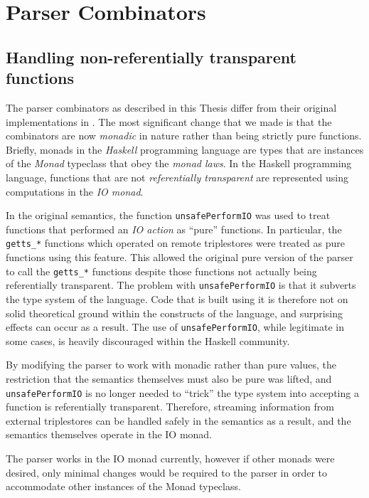 \documentclass[../main.tex]{subfiles}
\begin{document}
\chapter{Parser Combinators}

\section{Handling non-referentially transparent functions}

The parser combinators as described in this Thesis differ from their original implementations
in \cite{frosthafiz2008}.  The most significant change that we made is that the combinators are now {\em monadic} in nature rather than being strictly pure functions.
Briefly, monads in the {\em Haskell} programming language are types that are instances of the {\em Monad} typeclass that obey the
{\em monad laws}.  In the Haskell programming language, functions that are not {\em referentially transparent} are represented using computations in the {\em IO monad}.

In the original semantics, the function \texttt{unsafePerformIO} was used to treat functions that performed an {\em IO action} as ``pure'' functions.
In particular, the \texttt{getts\_*} functions which operated on remote triplestores were treated as pure functions using this feature.  This allowed
the original pure version of the parser to call the \texttt{getts\_*} functions despite those functions not actually being referentially transparent.  The problem
with \texttt{unsafePerformIO} is that it subverts the type system of the language.  Code that is built using it is therefore not on
solid theoretical ground within the constructs of the language, and surprising effects can occur as a result.  The use of \texttt{unsafePerformIO}, while
legitimate in some cases, is heavily discouraged within the Haskell community.

By modifying the parser to work with monadic rather than pure values, the restriction that the semantics themselves must also be pure was lifted, and
\texttt{unsafePerformIO} is no longer needed to ``trick'' the type system into accepting a function is referentially transparent.
Therefore, streaming information from external triplestores can be handled safely in the semantics as a result, and the semantics themselves
operate in the IO monad.

The parser works in the IO monad currently, however if other monads were desired, only minimal changes would be required to the parser in order to accommodate
other instances of the Monad typeclass.
\end{document}
